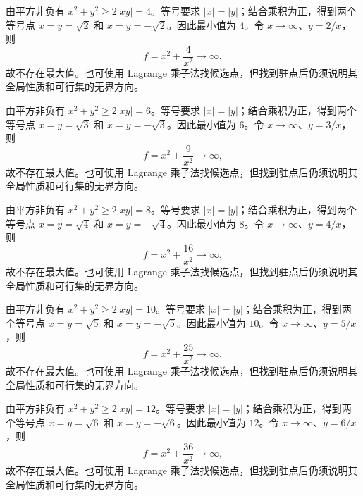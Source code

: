 \documentclass[12pt,fontset=fandol]{ctexart}
\begin{document}
\begin{solve}\label{ans:c34q21}
由平方非负有 $x^2+y^2\ge2|xy|=4$。等号要求 $|x|=|y|$；结合乘积为正，得到两个等号点 $x=y=\sqrt{2}$ 和 $x=y=-\sqrt{2}$。因此最小值为 $4$。令 $x\to\infty$、$y=2/x$，则
\[
f=x^2+\frac{4}{x^2}\to\infty,
\]
故不存在最大值。也可使用 Lagrange 乘子法找候选点，但找到驻点后仍须说明其全局性质和可行集的无界方向。
\end{solve}

\begin{solve}\label{ans:c34q22}
由平方非负有 $x^2+y^2\ge2|xy|=6$。等号要求 $|x|=|y|$；结合乘积为正，得到两个等号点 $x=y=\sqrt{3}$ 和 $x=y=-\sqrt{3}$。因此最小值为 $6$。令 $x\to\infty$、$y=3/x$，则
\[
f=x^2+\frac{9}{x^2}\to\infty,
\]
故不存在最大值。也可使用 Lagrange 乘子法找候选点，但找到驻点后仍须说明其全局性质和可行集的无界方向。
\end{solve}

\begin{solve}\label{ans:c34q23}
由平方非负有 $x^2+y^2\ge2|xy|=8$。等号要求 $|x|=|y|$；结合乘积为正，得到两个等号点 $x=y=\sqrt{4}$ 和 $x=y=-\sqrt{4}$。因此最小值为 $8$。令 $x\to\infty$、$y=4/x$，则
\[
f=x^2+\frac{16}{x^2}\to\infty,
\]
故不存在最大值。也可使用 Lagrange 乘子法找候选点，但找到驻点后仍须说明其全局性质和可行集的无界方向。
\end{solve}

\begin{solve}\label{ans:c34q24}
由平方非负有 $x^2+y^2\ge2|xy|=10$。等号要求 $|x|=|y|$；结合乘积为正，得到两个等号点 $x=y=\sqrt{5}$ 和 $x=y=-\sqrt{5}$。因此最小值为 $10$。令 $x\to\infty$、$y=5/x$，则
\[
f=x^2+\frac{25}{x^2}\to\infty,
\]
故不存在最大值。也可使用 Lagrange 乘子法找候选点，但找到驻点后仍须说明其全局性质和可行集的无界方向。
\end{solve}

\begin{solve}\label{ans:c34q25}
由平方非负有 $x^2+y^2\ge2|xy|=12$。等号要求 $|x|=|y|$；结合乘积为正，得到两个等号点 $x=y=\sqrt{6}$ 和 $x=y=-\sqrt{6}$。因此最小值为 $12$。令 $x\to\infty$、$y=6/x$，则
\[
f=x^2+\frac{36}{x^2}\to\infty,
\]
故不存在最大值。也可使用 Lagrange 乘子法找候选点，但找到驻点后仍须说明其全局性质和可行集的无界方向。
\end{solve}
\end{document}
